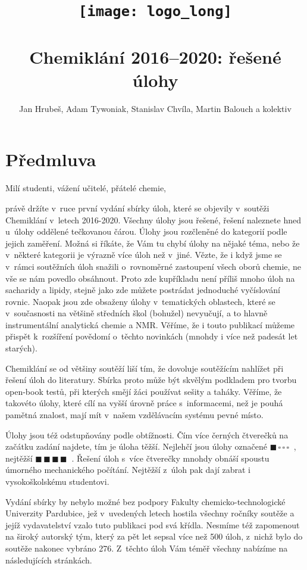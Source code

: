 \documentclass{book}
\title{\texttt{[image: logo\_long]} \\ \vspace{2cm} \\ Chemiklání 2016--2020: řešené úlohy}
\author{Jan Hrubeš, Adam Tywoniak, Stanislav Chvíla, Martin Balouch a kolektiv}
\date{}
\makeatletter
\newcommand{\jeden}{$\blacksquare \, \square \, \square \, \square \; \; $}
\newcommand{\ctyri}{$\blacksquare \, \blacksquare \, \blacksquare \, \blacksquare \; \; $}
\def\cleardoublepage{\clearpage\if@twoside \ifodd\c@page\else
  \hbox{}
  \thispagestyle{empty}
  \newpage
  \if@twocolumn\hbox{}\newpage\fi\fi\fi}
\makeatother
\begin{document}
\maketitle


\cleardoublepage

\section*{Předmluva}
Milí studenti, vážení učitelé, přátelé chemie,

právě držíte v~ruce první vydání sbírky úloh, které se objevily v~soutěži Chemiklání v~letech 2016-2020. Všechny úlohy jsou řešené, řešení naleznete hned u~úlohy oddělené tečkovanou čárou. Úlohy jsou rozčleněné do kategorií podle jejich zaměření. Možná si říkáte, že Vám tu chybí úlohy na nějaké téma, nebo že v~některé kategorii je výrazně více úloh než v~jiné. Vězte, že i když jsme se v~rámci soutěžních úloh snažili o~rovnoměrné zastoupení všech oborů chemie, ne vše se nám povedlo obsáhnout. Proto zde kupříkladu není příliš mnoho úloh na sacharidy a lipidy, stejně jako zde můžete postrádat jednoduché vyčíslování rovnic. Naopak jsou zde obsaženy úlohy v~tematických oblastech, které se v~současnosti na většině středních škol (bohužel) nevyučují, a to hlavně instrumentální analytická chemie a NMR. Věříme, že i touto publikací můžeme přispět k~rozšíření povědomí o~těchto novinkách (mnohdy i více než padesát let starých).

Chemiklání se od většiny soutěží liší tím, že dovoluje soutěžícím nahlížet při řešení úloh do literatury. Sbírka proto může být skvělým podkladem pro tvorbu open-book testů, při kterých smějí žáci používat sešity a taháky. Věříme, že takovéto úlohy, které cílí na vyšší úrovně práce s~informacemi, než je pouhá pamětná znalost, mají mít v~našem vzdělávacím systému pevné místo.

Úlohy jsou též odstupňovány podle obtížnosti. Čím více černých čtverečků na začátku zadání najdete, tím je úloha těžší. Nejlehčí jsou úlohy označené \jeden, nejtěžší \ctyri. Řešení úloh s~více čtverečky mnohdy obnáší spoustu úmorného mechanického počítání. Nejtěžší z~úloh pak dají zabrat i vysokoškolskému studentovi.

Vydání sbírky by nebylo možné bez podpory Fakulty chemicko-technologické Univerzity Pardubice, jež v~uvedených letech hostila všechny ročníky soutěže a jejíž vydavatelství vzalo tuto publikaci pod svá křídla. Nesmíme též zapomenout na široký autorský tým, který za pět let sepsal více než 500 úloh, z~nichž bylo do soutěže nakonec vybráno 276. Z~těchto úloh Vám téměř všechny nabízíme na následujících stránkách.
\end{document}
